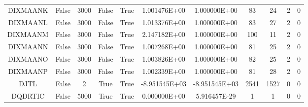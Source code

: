 \begin{longtable}{ccccccccccc}
	\cellcolor{default1} DIXMAANK& \cellcolor{default1} False& \cellcolor{default1} 3000& \cellcolor{default1} False& \cellcolor{default1} True& \cellcolor{poor} 1.001476E+00& \cellcolor{best} 1.000000E+00& \cellcolor{poor} 83& \cellcolor{best} 24& \cellcolor{default1} 2& \cellcolor{default1} 0\\
	\cellcolor{default2} DIXMAANL& \cellcolor{default2} False& \cellcolor{default2} 3000& \cellcolor{default2} False& \cellcolor{default2} True& \cellcolor{poor} 1.013376E+00& \cellcolor{best} 1.000000E+00& \cellcolor{poor} 83& \cellcolor{best} 27& \cellcolor{default2} 2& \cellcolor{default2} 0\\
	\cellcolor{default1} DIXMAANM& \cellcolor{default1} False& \cellcolor{default1} 3000& \cellcolor{default1} False& \cellcolor{default1} True& \cellcolor{poor} 2.147182E+00& \cellcolor{best} 1.000000E+00& \cellcolor{poor} 100& \cellcolor{best} 11& \cellcolor{default1} 2& \cellcolor{default1} 0\\
	\cellcolor{default2} DIXMAANN& \cellcolor{default2} False& \cellcolor{default2} 3000& \cellcolor{default2} False& \cellcolor{default2} True& \cellcolor{poor} 1.007268E+00& \cellcolor{best} 1.000000E+00& \cellcolor{poor} 81& \cellcolor{best} 25& \cellcolor{default2} 2& \cellcolor{default2} 0\\
	\cellcolor{default1} DIXMAANO& \cellcolor{default1} False& \cellcolor{default1} 3000& \cellcolor{default1} False& \cellcolor{default1} True& \cellcolor{poor} 1.003826E+00& \cellcolor{best} 1.000000E+00& \cellcolor{poor} 82& \cellcolor{best} 25& \cellcolor{default1} 2& \cellcolor{default1} 0\\
	\cellcolor{default2} DIXMAANP& \cellcolor{default2} False& \cellcolor{default2} 3000& \cellcolor{default2} False& \cellcolor{default2} True& \cellcolor{poor} 1.002339E+00& \cellcolor{best} 1.000000E+00& \cellcolor{poor} 81& \cellcolor{best} 28& \cellcolor{default2} 2& \cellcolor{default2} 0\\
	\cellcolor{default1} DJTL& \cellcolor{default1} False& \cellcolor{default1} 2& \cellcolor{default1} True& \cellcolor{default1} True& \cellcolor{ok} -8.951545E+03& \cellcolor{best} -8.951545E+03& \cellcolor{ok} 2541& \cellcolor{best} 1527& \cellcolor{default1} 0& \cellcolor{default1} 0\\
	\cellcolor{default2} DQDRTIC& \cellcolor{default2} False& \cellcolor{default2} 5000& \cellcolor{default2} True& \cellcolor{default2} True& \cellcolor{best} 0.000000E+00& \cellcolor{ok} 5.916457E-29& \cellcolor{best} 1& \cellcolor{best} 1& \cellcolor{default2} 0& \cellcolor{default2} 0\\

\end{longtable}
